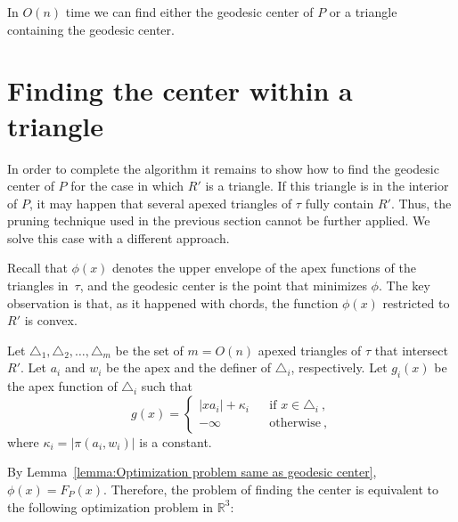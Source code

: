 \documentclass[a4paper,UKenglish]{lipics}
\newcommand{\F}[2]{\ensuremath{F_{\scriptscriptstyle #1}(#2)}}
\newcommand{\m}{\ensuremath{m_{\scriptscriptstyle R}}}
\newcommand{\g}[2]{\ensuremath{|\pi(#1, #2)|}}
\newcommand{\reg}{\ensuremath{R'}}
\newcommand{\tcell}{4-cell\xspace}
\newcommand{\tcells}{4-cells\xspace}
\begin{document}

\begin{lemma}\label{lemma:Finding the convex trapezoid}
In $O(n)$ time we can find either the geodesic center of $P$ or a triangle containing the geodesic center.
\end{lemma}

\section{Finding the center within a triangle}\label{Section:Solving convex optimization poblem}
In order to complete the algorithm it remains to show how to find the geodesic center of $P$ for the case in which $\reg$ is a triangle. If this triangle is in the interior of $P$, it may happen that several apexed triangles of $\tau$ fully contain $\reg$. 
Thus, the pruning technique used in the previous section cannot be further applied. We solve this case with a different approach.
  
Recall that $\phi(x)$ denotes the upper envelope of the apex functions of the triangles in~$\tau$, and the geodesic center is the point that minimizes $\phi$.
The key observation is that, as it happened with chords, the function $\phi(x)$ restricted to $\reg$ is convex. 

Let $\triangle_{1}, \triangle_{2}, \ldots, \triangle_{m}$ be the set of $m= O(n)$ apexed triangles of $\tau$ that intersect $\reg$. 
Let $a_i$ and $w_i$ be the apex and the definer of $\triangle_i$, respectively.
Let $g_i(x)$  be the apex function of $\triangle_i$ such that 
$$g(x) = \left\{ \begin{array}{lll}
|x a_i| + \kappa_i && \text{if }x\in \triangle_i\ ,\\
-\infty&&\text{otherwise}\ ,
\end{array}\right.$$
where $\kappa_i = \g{a_i}{w_i}$ is a constant.

By Lemma~\ref{lemma:Optimization problem same as geodesic center}, $\phi(x) = \F{P}{x}$. 
Therefore, the problem of finding the center is equivalent to the following optimization problem in $\mathbb{R}^3$:
\end{document}
